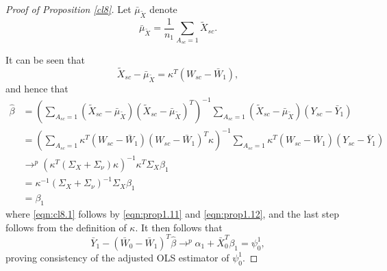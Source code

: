 \begin{proof}[Proof of Proposition \ref{cl8}]
Let $\bar{\mu}_{\tilde{X}}$ denote 
\[ \bar{\mu}_{\tilde{X}} = \frac{1}{n_1} \sum_{A_{sc} = 1} \tilde{X}_{sc}.\]

It can be seen that 
\[ \tilde{X}_{sc} - \bar{\mu}_{\tilde{X}} = \kappa^T(W_{sc} - \bar{W}_1),\]
and hence that 
\begin{align}
 \nonumber \hat{\beta} &=  \left(\sum_{A_{sc}=1} (\tilde{X}_{sc} - \bar{\mu}_{\tilde{X}})(\tilde{X}_{sc} - \bar{\mu}_{\tilde{X}})^T\right)^{-1} \sum_{A_{sc}=1} (\tilde{X}_{sc} - \bar{\mu}_{\tilde{X}})(Y_{sc} - \bar{Y}_1) \\
 \nonumber & = \left(\sum_{A_{sc}=1} \kappa^T (W_{sc} - \bar{W}_1)(W_{sc} - \bar{W}_1)^T \kappa\right)^{-1} \sum_{A_{sc}=1} \kappa^T(W_{sc} - \bar{W}_1)(Y_{sc} - \bar{Y}_1) \\
 & \to^p (\kappa^T (\Sigma_X + \Sigma_\nu) \kappa)^{-1} \kappa^T \Sigma_X \beta_1  \label{eqn:cl8.1}\\
 \nonumber & = \kappa^{-1} (\Sigma_X + \Sigma_{\nu})^{-1} \Sigma_X \beta_1 \\
 \nonumber & = \beta_1
 \end{align}
 where \eqref{eqn:cl8.1} follows by \eqref{eqn:prop1.11} and \eqref{eqn:prop1.12}, and the last step follows from the definition of $\kappa$. It then follows that 
 \[ \bar{Y}_1 - (\bar{W}_0 - \bar{W}_1)^T \hat{\beta} \to^p \alpha_1 + \bar{X}_0^T \beta_1 = \psi_0^1,\]
 proving consistency of the adjusted OLS estimator of $\psi_0^1$.
    
\end{proof}

